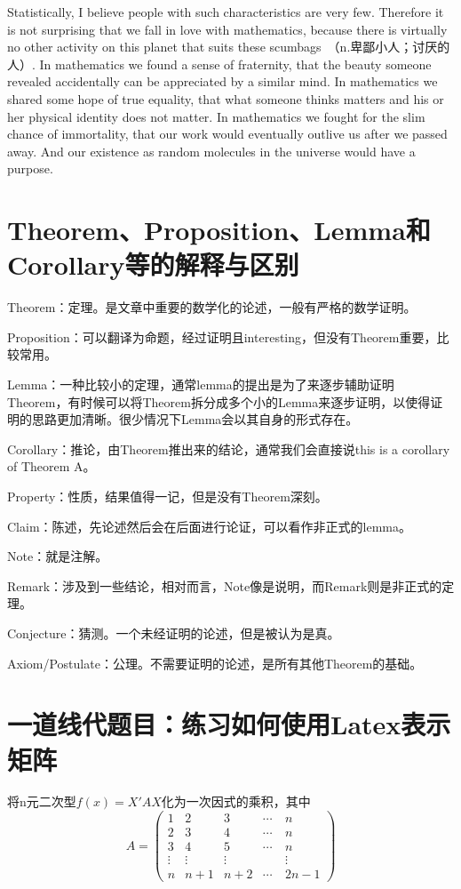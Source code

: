 \documentclass{article}
\begin{document}
Statistically, I believe people with such characteristics are very few. Therefore it is not surprising that we fall in love with mathematics, because there is virtually no other activity on this planet that suits these scumbags　（n.卑鄙小人；讨厌的人）. In mathematics we found a sense of fraternity, that the beauty someone revealed accidentally can be appreciated by a similar mind. In mathematics we shared some hope of true equality, that what someone thinks matters and his or her physical identity does not matter. In mathematics we fought for the slim chance of immortality, that our work would eventually outlive us after we passed away. And our existence as random molecules in the universe would have a purpose.


\section{Theorem、Proposition、Lemma和Corollary等的解释与区别 }

Theorem：定理。是文章中重要的数学化的论述，一般有严格的数学证明。

Proposition：可以翻译为命题，经过证明且interesting，但没有Theorem重要，比较常用。


Lemma：一种比较小的定理，通常lemma的提出是为了来逐步辅助证明Theorem，有时候可以将Theorem拆分成多个小的Lemma来逐步证明，以使得证明的思路更加清晰。很少情况下Lemma会以其自身的形式存在。

Corollary：推论，由Theorem推出来的结论，通常我们会直接说this is a corollary of Theorem A。

Property：性质，结果值得一记，但是没有Theorem深刻。

Claim：陈述，先论述然后会在后面进行论证，可以看作非正式的lemma。

Note：就是注解。

Remark：涉及到一些结论，相对而言，Note像是说明，而Remark则是非正式的定理。

Conjecture：猜测。一个未经证明的论述，但是被认为是真。

Axiom/Postulate：公理。不需要证明的论述，是所有其他Theorem的基础。

\section{一道线代题目：练习如何使用Latex表示矩阵}

将n元二次型\( f(x) = X'AX \)化为一次因式的乘积，其中
\[
A = 
\begin{pmatrix}
1 & 2 & 3 & \cdots & n\\
2 & 3 & 4 & \cdots & n\\
3 & 4 & 5 &\cdots & n\\
\vdots & \vdots & \vdots & \quad & \vdots \\
n & n+1 & n+2 & \cdots & 2n-1
\end{pmatrix}
\]
\end{document}
